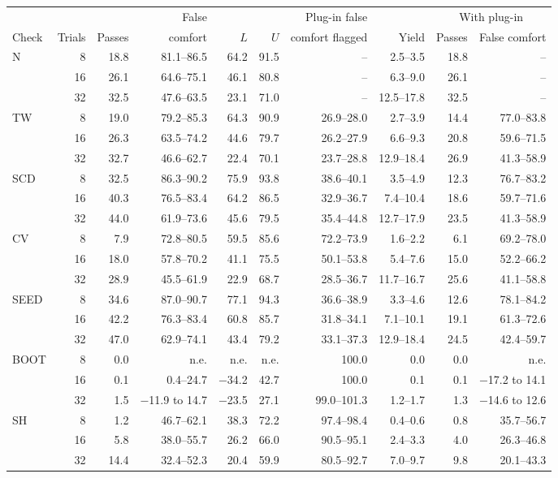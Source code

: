 \begin{tabular}{lrrrrrrrrr}
\toprule
 & & & False & & & Plug-in false & & \multicolumn{2}{c}{With plug-in} \\
\cmidrule(lr){9-10}
Check & Trials & Passes & comfort & $L$ & $U$ & comfort flagged & Yield & Passes & False comfort \\
\midrule
N & 8 & 18.8 & 81.1--86.5 & 64.2 & 91.5 & -- & 2.5--3.5 & 18.8 & -- \\
 & 16 & 26.1 & 64.6--75.1 & 46.1 & 80.8 & -- & 6.3--9.0 & 26.1 & -- \\
 & 32 & 32.5 & 47.6--63.5 & 23.1 & 71.0 & -- & 12.5--17.8 & 32.5 & -- \\
\addlinespace
TW & 8 & 19.0 & 79.2--85.3 & 64.3 & 90.9 & 26.9--28.0 & 2.7--3.9 & 14.4 & 77.0--83.8 \\
 & 16 & 26.3 & 63.5--74.2 & 44.6 & 79.7 & 26.2--27.9 & 6.6--9.3 & 20.8 & 59.6--71.5 \\
 & 32 & 32.7 & 46.6--62.7 & 22.4 & 70.1 & 23.7--28.8 & 12.9--18.4 & 26.9 & 41.3--58.9 \\
\addlinespace
SCD & 8 & 32.5 & 86.3--90.2 & 75.9 & 93.8 & 38.6--40.1 & 3.5--4.9 & 12.3 & 76.7--83.2 \\
 & 16 & 40.3 & 76.5--83.4 & 64.2 & 86.5 & 32.9--36.7 & 7.4--10.4 & 18.6 & 59.7--71.6 \\
 & 32 & 44.0 & 61.9--73.6 & 45.6 & 79.5 & 35.4--44.8 & 12.7--17.9 & 23.5 & 41.3--58.9 \\
\addlinespace
CV & 8 & 7.9 & 72.8--80.5 & 59.5 & 85.6 & 72.2--73.9 & 1.6--2.2 & 6.1 & 69.2--78.0 \\
 & 16 & 18.0 & 57.8--70.2 & 41.1 & 75.5 & 50.1--53.8 & 5.4--7.6 & 15.0 & 52.2--66.2 \\
 & 32 & 28.9 & 45.5--61.9 & 22.9 & 68.7 & 28.5--36.7 & 11.7--16.7 & 25.6 & 41.1--58.8 \\
\addlinespace
SEED & 8 & 34.6 & 87.0--90.7 & 77.1 & 94.3 & 36.6--38.9 & 3.3--4.6 & 12.6 & 78.1--84.2 \\
 & 16 & 42.2 & 76.3--83.4 & 60.8 & 85.7 & 31.8--34.1 & 7.1--10.1 & 19.1 & 61.3--72.6 \\
 & 32 & 47.0 & 62.9--74.1 & 43.4 & 79.2 & 33.1--37.3 & 12.9--18.4 & 24.5 & 42.4--59.7 \\
\addlinespace
BOOT & 8 & 0.0 & n.e. & n.e. & n.e. & 100.0 & 0.0 & 0.0 & n.e. \\
 & 16 & 0.1 & 0.4--24.7 & $-$34.2 & 42.7 & 100.0 & 0.1 & 0.1 & $-$17.2 to 14.1 \\
 & 32 & 1.5 & $-$11.9 to 14.7 & $-$23.5 & 27.1 & 99.0--101.3 & 1.2--1.7 & 1.3 & $-$14.6 to 12.6 \\
\addlinespace
SH & 8 & 1.2 & 46.7--62.1 & 38.3 & 72.2 & 97.4--98.4 & 0.4--0.6 & 0.8 & 35.7--56.7 \\
 & 16 & 5.8 & 38.0--55.7 & 26.2 & 66.0 & 90.5--95.1 & 2.4--3.3 & 4.0 & 26.3--46.8 \\
 & 32 & 14.4 & 32.4--52.3 & 20.4 & 59.9 & 80.5--92.7 & 7.0--9.7 & 9.8 & 20.1--43.3 \\
\bottomrule
\end{tabular}
